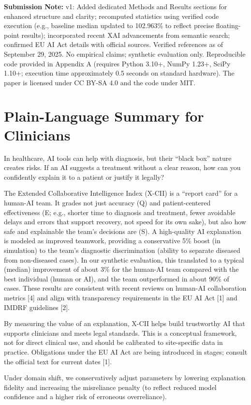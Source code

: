 \documentclass[11pt,a4paper]{article}
\begin{document}
\noindent\textbf{Submission Note:} v1: Added dedicated Methods and Results sections for enhanced structure and clarity; recomputed statistics using verified code execution (e.g., baseline median updated to 102.963\% to reflect precise floating-point results); incorporated recent XAI advancements from semantic search; confirmed EU AI Act details with official sources. Verified references as of September 29, 2025. No empirical claims; synthetic evaluation only. Reproducible code provided in Appendix A (requires Python 3.10+, NumPy 1.23+, SciPy 1.10+; execution time approximately 0.5 seconds on standard hardware). The paper is licensed under CC BY-SA 4.0 and the code under MIT.
\section*{Plain-Language Summary for Clinicians}
In healthcare, AI tools can help with diagnosis, but their ``black box'' nature creates risks. If an AI suggests a treatment without a clear reason, how can you confidently explain it to a patient or justify it legally?

The Extended Collaborative Intelligence Index (X-CII) is a ``report card'' for a human-AI team. It grades not just accuracy (Q) and patient-centered effectiveness (E; e.g., shorter time to diagnosis and treatment, fewer avoidable delays and errors that support recovery, not speed for its own sake), but also how safe and explainable the team's decisions are (S). A high-quality AI explanation is modeled as improved teamwork, providing a conservative 5\% boost (in simulation) to the team's diagnostic discrimination (ability to separate diseased from non-diseased cases). In our synthetic evaluation, this translated to a typical (median) improvement of about 3\% for the human-AI team compared with the best individual (human or AI), and the team outperformed in about 90\% of cases. These results are consistent with recent reviews on human-AI collaboration metrics [4] and align with transparency requirements in the EU AI Act [1] and IMDRF guidelines [2].

By measuring the value of an explanation, X-CII helps build trustworthy AI that supports clinicians and meets legal standards. This is a conceptual framework, not for direct clinical use, and should be calibrated to site-specific data in practice. Obligations under the EU AI Act are being introduced in stages; consult the official text for current dates [1].

Under domain shift, we conservatively adjust parameters by lowering explanation fidelity and increasing the misreliance penalty (to reflect reduced model confidence and a higher risk of erroneous overreliance).
\end{document}
